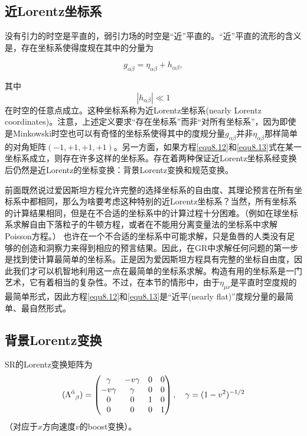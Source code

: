 \subsection*{近Lorentz坐标系}
没有引力的时空是平直的，弱引力场的时空是“近”平直的。“近”平直的流形的含义是，存在坐标系使得度规在其中的分量为
\begin{shaded}
\begin{equation}
    g_{\alpha \beta} = \eta_{\alpha \beta} + h_{\alpha \beta},
\label{equ8.12}
\end{equation}
\end{shaded}
其中
\begin{equation}
    |h_{\alpha \beta}| \ll 1
\label{equ8.13}
\end{equation}
在时空的任意点成立。这种坐标系称为近Lorentz坐标系(nearly Lorentz coordinates)。注意，上述定义要求“存在坐标系”而非“对所有坐标系”，因为即使是Minkowski时空也可以有奇怪的坐标系使得其中的度规分量$g_{\alpha \beta}$并非$\eta_{\alpha \beta}$那样简单的对角矩阵$(-1, +1, +1, +1)$。另一方面，如果方程\eqref{equ8.12}和\eqref{equ8.13}式在某一坐标系成立，则存在许多这样的坐标系。存在着两种保证近Lorentz坐标系经变换后仍然是近Lorentz的坐标变换：背景Lorentz变换和规范变换。

前面既然说过爱因斯坦方程允许完整的选择坐标系的自由度、其理论预言在所有坐标系中都相同，那么为啥要考虑这种特别的近Lorentz坐标系？当然，所有坐标系的计算结果相同，但是在不合适的坐标系中的计算过程十分困难。（例如在球坐标系求解自由下落粒子的牛顿方程，或者在不能用分离变量法的坐标系中求解Poisson方程。） 也许在一个不合适的坐标系中可能求解，只是鱼唇的人类没有足够的创造和洞察力来得到相应的预言结果。因此，在GR中求解任何问题的第一步是找到使计算最简单的坐标系。正是因为爱因斯坦方程具有完整的坐标自由度，因此我们才可以机智地利用这一点在最简单的坐标系求解。构造有用的坐标系是一门艺术，它有着相当的复杂性。不过，在本节的情形中，由于$\eta_{\mu \nu}$是平直时空度规的最简单形式，因此方程\eqref{equ8.12}和\eqref{equ8.13}是“近平(nearly flat)”度规分量的最简单、最自然形式。

\subsection*{背景Lorentz变换}
SR的Lorentz变换矩阵为
\begin{equation}
    (\Lambda\indices{^{\bar{\alpha}}_{\beta}}) = 
    \begin{pmatrix}
        \gamma & -v\gamma & 0 & 0 \\
        -v\gamma & \gamma & 0 & 0 \\
        0 & 0 & 1 & 0 \\
        0 & 0 & 0 & 1
    \end{pmatrix}, \quad \gamma = (1 - v^2)^{-1/2}
\label{equ8.14}
\end{equation}
（对应于$x$方向速度$v$的boost变换）。

